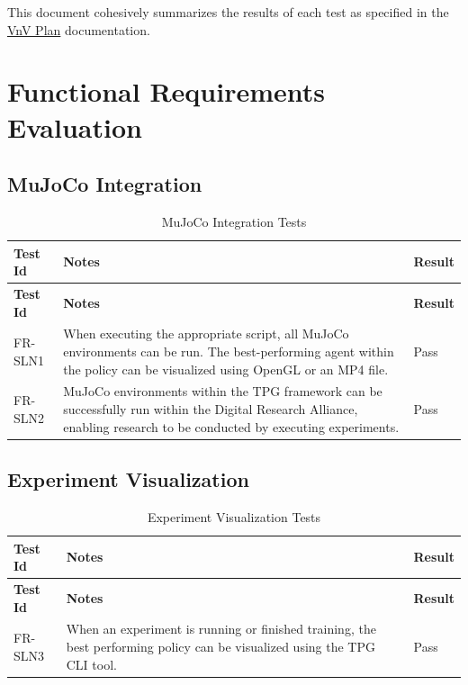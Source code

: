 \documentclass[12pt, titlepage]{article}
\begin{document}
\listoffigures %

\newpage


This document cohesively summarizes the results of each test as specified in the \href{https://github.com/TPGEngine/tpg/blob/main/docs/VnVPlan/VnVPlan.pdf}{VnV Plan} documentation.

\section{Functional Requirements Evaluation}

\subsection{MuJoCo Integration}

\begin{center}
\begin{longtable}{|p{2cm}|p{8cm}|p{2cm}|}
  \caption{MuJoCo Integration Tests} \\
\hline
\textbf{Test Id} & \textbf{Notes} & \textbf{Result} \\
\hline
\endfirsthead
\hline
\textbf{Test Id} & \textbf{Notes} & \textbf{Result} \\
\hline
\endhead
FR-SLN1 & When executing the appropriate script, all MuJoCo environments can be run. The best-performing agent within the policy can be visualized using OpenGL or an MP4 file. & Pass \\
\hline
FR-SLN2 & MuJoCo environments within the TPG framework can be successfully run within the Digital Research Alliance, enabling research to be conducted by executing experiments. & Pass \\
\hline
\end{longtable}
\end{center}

\subsection{Experiment Visualization}

\begin{center}
  \begin{longtable}{|p{2cm}|p{8cm}|p{2cm}|}
    \caption{Experiment Visualization Tests} \\
  \hline
  \textbf{Test Id} & \textbf{Notes} & \textbf{Result} \\
  \hline
  \endfirsthead
  \hline
  \textbf{Test Id} & \textbf{Notes} & \textbf{Result} \\
  \hline
  \endhead
  FR-SLN3 & When an experiment is running or finished training, the best performing policy can be visualized using the TPG CLI tool. & Pass \\
  \hline
  \end{longtable}
\end{center}
\end{document}
